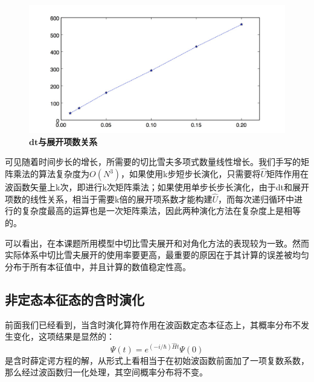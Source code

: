 \begin{figure}[hbt]
  \centering
  \captionsetup{justification=centering}
  \vspace{-1mm}
  \includegraphics[width=0.99\linewidth]{dt-M/dt-M}
  \caption{$\boldsymbol{dt}$\textbf{与展开项数关系}}
  \label{fig:dt-M}
\end{figure}

可见随着时间步长的增长，所需要的切比雪夫多项式数量线性增长。我们手写的矩阵乘法的算法复杂度为$O(N^3)$，如果使用k步短步长演化，只需要将$\hat{U}$矩阵作用在波函数矢量上k次，即进行k次矩阵乘法；如果使用单步长步长演化，由于dt和展开项数的线性关系，相当于需要k倍的展开项系数才能构建$\hat{U}$，而每次递归循环中进行的复杂度最高的运算也是一次矩阵乘法，因此两种演化方法在复杂度上是相等的。

可以看出，在本课题所用模型中切比雪夫展开和对角化方法的表现较为一致。然而实际体系中切比雪夫展开的使用率要更高，最重要的原因在于其计算的误差被均匀分布于所有本征值中，并且计算的数值稳定性高。

\subsection{非定态本征态的含时演化}
前面我们已经看到，当含时演化算符作用在波函数定态本征态上，其概率分布不发生变化，这项结果是显然的：
\begin{equation}
  \Psi(t) = e^{(-i/\hbar)\hat{H}t}\Psi(0)
\end{equation} 
是含时薛定谔方程的解，从形式上看相当于在初始波函数前面加了一项复数系数，那么经过波函数归一化处理，其空间概率分布将不变。

